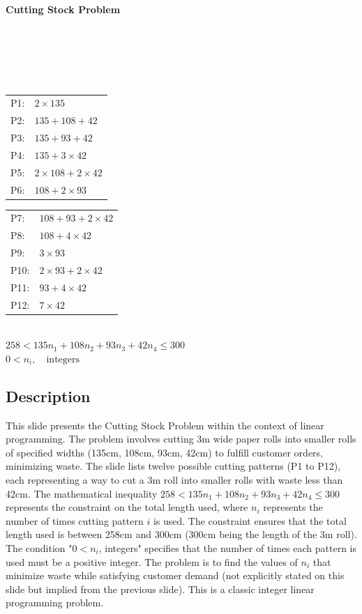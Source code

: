 \documentclass{article}%
\begin{document}
\textbf{Cutting Stock Problem} \\
 \\
 \\
 \\
 \\
 \\
\begin{tabular}{ll}
P1: & $2 \times 135$ \\
P2: & $135 + 108 + 42$ \\
P3: & $135 + 93 + 42$ \\
P4: & $135 + 3 \times 42$ \\
P5: & $2 \times 108 + 2 \times 42$ \\
P6: & $108 + 2 \times 93$ \\
\end{tabular}
\begin{tabular}{ll}
P7: & $108 + 93 + 2 \times 42$ \\
P8: & $108 + 4 \times 42$ \\
P9: & $3 \times 93$ \\
P10: & $2 \times 93 + 2 \times 42$ \\
P11: & $93 + 4 \times 42$ \\
P12: & $7 \times 42$ \\
\end{tabular} \\
$258 < 135n_1 + 108n_2 + 93n_3 + 42n_4 \le 300$ \\
$0 < n_i, \quad \text{integers}$
%
\subsection{Description}%
This slide presents the Cutting Stock Problem within the context of linear programming.  The problem involves cutting 3m wide paper rolls into smaller rolls of specified widths (135cm, 108cm, 93cm, 42cm) to fulfill customer orders, minimizing waste.  The slide lists twelve possible cutting patterns (P1 to P12), each representing a way to cut a 3m roll into smaller rolls with waste less than 42cm.  The mathematical inequality $258 < 135n_1 + 108n_2 + 93n_3 + 42n_4 \le 300$ represents the constraint on the total length used, where $n_i$ represents the number of times cutting pattern $i$ is used. The constraint ensures that the total length used is between 258cm and 300cm (300cm being the length of the 3m roll). The condition "$0 < n_i$, integers" specifies that the number of times each pattern is used must be a positive integer.  The problem is to find the values of $n_i$ that minimize waste while satisfying customer demand (not explicitly stated on this slide but implied from the previous slide). This is a classic integer linear programming problem.%
\end{document}
